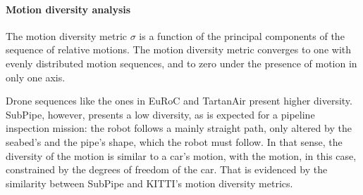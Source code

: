 \paragraph*{Motion diversity analysis} The motion diversity metric $\sigma$ is a function of the principal components of the sequence of relative motions. The motion diversity metric converges to one with evenly distributed motion sequences, and to zero under the presence of motion in only one axis.

Drone sequences like the ones in EuRoC and TartanAir present higher diversity. SubPipe, however, presents a low diversity, as is expected for a pipeline inspection mission: the robot follows a mainly straight path, only altered by the seabed's and the pipe's shape, which the robot must follow. In that sense, the diversity of the motion is similar to a car's motion, with the motion, in this case, constrained by the degrees of freedom of the car. That is evidenced by the similarity between SubPipe and KITTI's motion diversity metrics.

